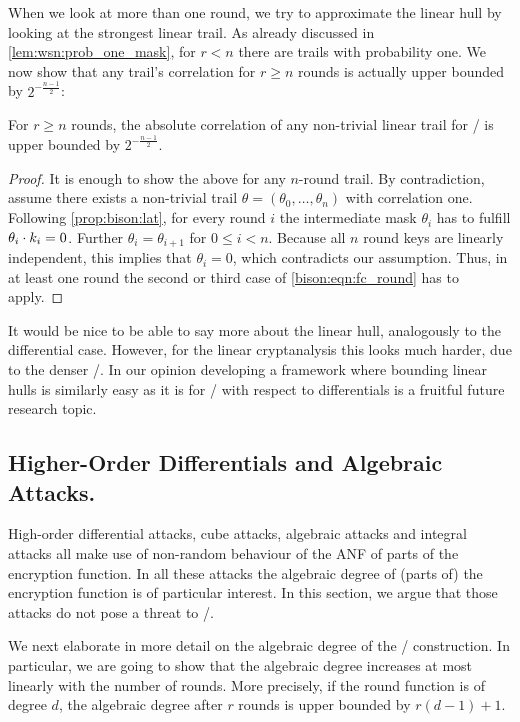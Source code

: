 When we look at more than one round, we try to approximate the linear hull by looking at the strongest linear trail.
As already discussed in \cref{lem:wsn:prob_one_mask}, for $r < n$ there are trails with probability one.
We now show that any trail's correlation for $r \geqslant n$ rounds is actually upper bounded by $2^{-\frac{n-1}{2}}$:
\begin{proposition}\label{prop:bison:lc_long}
    For $r \geqslant n$ rounds, the absolute correlation of any non-trivial linear trail for \bison/ is upper bounded by $2^{-\frac{n-1}{2}}$.
\end{proposition}
\begin{proof}
    It is enough to show the above for any $n$-round trail.
    By contradiction, assume there exists a non-trivial trail $\theta = (\theta_0, \ldots, \theta_n)$ with correlation one.
    Following \cref{prop:bison:lat}, for every round $i$ the intermediate mask $\theta_i$ has to fulfill $\theta_i \cdot k_i = 0$.
    Further $\theta_i = \theta_{i+1}$ for $0 \leqslant i < n$.
    Because all $n$ round keys are linearly independent, this implies that $\theta_i = 0$, which contradicts our assumption.
    Thus, in at least one round the second or third case of \cref{bison:eqn:fc_round} has to apply.
\end{proof}
It would be nice to be able to say more about the linear hull, analogously to the differential case.
However, for the linear cryptanalysis this looks much harder, due to the denser \LAT/.
In our opinion developing a framework where bounding linear hulls is similarly easy as it is for \bison/ with respect to differentials is a fruitful future research topic.

\subsection{Higher-Order Differentials and Algebraic Attacks.}
High-order differential attacks, cube attacks, algebraic attacks and integral attacks all make use of non-random behaviour of the ANF of parts of the encryption function.
In all these attacks the algebraic degree of (parts of) the encryption function is of particular interest.
In this section, we argue that those attacks do not pose a threat to \bison/.

We next elaborate in more detail on the algebraic degree of the \WSN/ construction.
In particular, we are going to show that the algebraic degree increases at most linearly with the number of rounds.
More precisely, if the round function is of degree $d$, the algebraic degree after $r$ rounds is upper bounded by $r(d-1)+1$.

